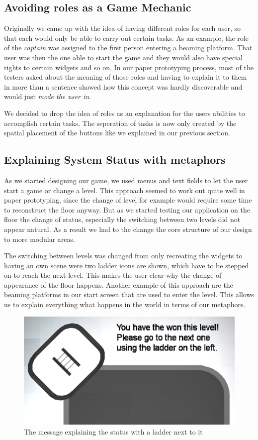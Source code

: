 \documentclass{sigchi}
\begin{document}
\subsection{Avoiding roles as a Game Mechanic}
\vspace{1mm}

Originally we came up with the idea of having different roles for each user, so that each would only be able to carry out certain tasks. As an example, the role of the \textit{captain} was assigned to the first person entering a beaming platform. That user was then the one able to start the game and they would also have special rights to certain widgets and so on. In our paper prototyping process, most of the testers asked about the meaning of those roles and having to explain it to them in more than a sentence showed how this concept was hardly discoverable and would just \textit{mode the user in}.

We decided to drop the idea of roles as an explanation for the users abilities to accomplish certain tasks. The seperation of tasks is now only created by the spatial placement of the buttons like we explained in our previous section.  

\subsection{Explaining System Status with metaphors}
\vspace{1mm}
As we started designing our game, we used menus and text fields to let the user start a game or change a level. This approach seemed to work out quite well in paper prototyping, since the change of level for example would require some time to reconstruct the floor anyway. But as we started testing our application on the floor the change of status, especially the switching between two levels did not appear natural. As a result we had to the change the core structure of our design to more modular areas.

The switching between levels was changed from only recreating the widgets to having an own scene were two ladder icons are shown, which have to be stepped on to reach the next level. This makes the user clear why the change of appearance of the floor happens. Another example of this approach are the beaming platforms in our start screen that are used to enter the level. This allows us to explain everything what happens in the world in terms of our metaphors. 

\begin{figure}[H]
\centering
\includegraphics[width=0.8\columnwidth]{ladder}
\caption{The message explaining the status with a ladder next to it}
\label{fig:gamingArea}
\end{figure}
\end{document}
